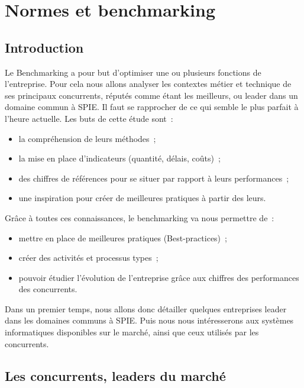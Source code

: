 \chapter{Normes et benchmarking}


\section{Introduction}
    	Le Benchmarking a pour but d'optimiser une ou plusieurs fonctions de l'entreprise. Pour cela nous allons analyser les contextes métier et technique de ses principaux concurrents, réputés comme étant les meilleurs, ou leader dans un domaine commun à SPIE. Il faut se rapprocher de ce qui semble le plus parfait à l'heure actuelle.
    	Les buts de cette étude sont~:
    \begin{itemize}
    	\item la compréhension de leurs méthodes~;
    	\item la mise en place d'indicateurs (quantité, délais, coûts)~;
    	\item des chiffres de références pour se situer par rapport à leurs performances~;
    	\item une inspiration pour créer de meilleures pratiques à partir des leurs.
    \end{itemize}
    \bigbreak
    	Grâce à toutes ces connaissances, le benchmarking va nous permettre de~:
    \begin{itemize}
    	\item mettre en place de meilleures pratiques (Best-practices)~;
    	\item créer des activités et processus types~;
    	\item pouvoir étudier l'évolution de l'entreprise grâce aux chiffres des performances des concurrents.
    \end{itemize}
    \bigbreak
    	Dans un premier temps, nous allons donc détailler quelques entreprises leader dans les domaines communs à SPIE. Puis nous nous intéresserons aux systèmes informatiques disponibles sur le marché, ainsi que ceux utilisés par les concurrents.

\section{Les concurrents, leaders du marché}

